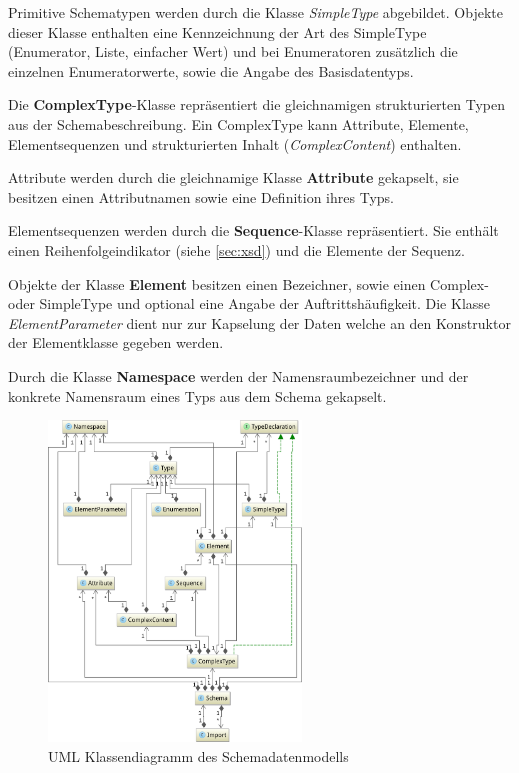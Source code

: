 Primitive Schematypen werden durch die Klasse \emph{SimpleType} abgebildet. Objekte dieser Klasse enthalten eine Kennzeichnung der Art des SimpleType (Enumerator, Liste, einfacher Wert) und bei Enumeratoren zusätzlich die einzelnen Enumeratorwerte, sowie die Angabe des Basisdatentyps.

Die \textbf{ComplexType}-Klasse repräsentiert die gleichnamigen strukturierten Typen aus der Schemabeschreibung. 
Ein ComplexType kann Attribute, Elemente, Elementsequenzen und strukturierten Inhalt (\emph{ComplexContent}) enthalten.

Attribute werden durch die gleichnamige Klasse \textbf{Attribute} gekapselt, sie besitzen einen Attributnamen sowie eine Definition ihres Typs.

Elementsequenzen werden durch die \textbf{Sequence}-Klasse repräsentiert. Sie enthält einen Reihenfolgeindikator (siehe \cref{sec:xsd}) und die Elemente der Sequenz.

Objekte der Klasse \textbf{Element} besitzen einen Bezeichner, sowie einen Complex- oder SimpleType und optional eine Angabe der Auftrittshäufigkeit. Die Klasse \emph{ElementParameter} dient nur zur Kapselung der Daten welche an den Konstruktor der Elementklasse gegeben werden.

Durch die Klasse \textbf{Namespace} werden der Namensraumbezeichner und der konkrete Namensraum eines Typs aus dem Schema gekapselt. 

\begin{figure}[tb]
    \begin{center}
        \includegraphics[width=0.6\textwidth]{resources/typemodel}
    \end{center}
    \caption{UML Klassendiagramm des Schemadatenmodells}
    \label{fig:schema_model}
\end{figure}